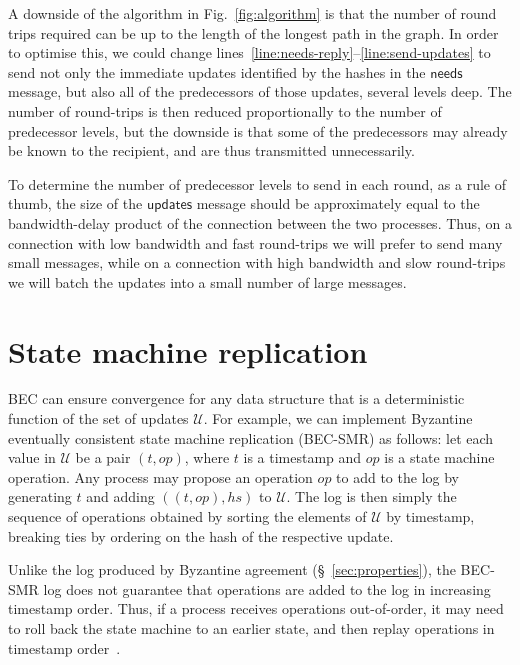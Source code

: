 \documentclass[manuscript,anonymous]{acmart}
\begin{document}
A downside of the algorithm in Fig.~\ref{fig:algorithm} is that the number of round trips required can be up to the length of the longest path in the graph.
In order to optimise this, we could change lines~\ref{line:needs-reply}--\ref{line:send-updates} to send not only the immediate updates identified by the hashes in the $\mathsf{needs}$ message, but also all of the predecessors of those updates, several levels deep.
The number of round-trips is then reduced proportionally to the number of predecessor levels, but the downside is that some of the predecessors may already be known to the recipient, and are thus transmitted unnecessarily.

To determine the number of predecessor levels to send in each round, as a rule of thumb, the size of the $\mathsf{updates}$ message should be approximately equal to the bandwidth-delay product of the connection between the two processes.
Thus, on a connection with low bandwidth and fast round-trips we will prefer to send many small messages, while on a connection with high bandwidth and slow round-trips we will batch the updates into a small number of large messages.


\section{State machine replication}\label{sec:smr}

BEC can ensure convergence for any data structure that is a deterministic function of the set of updates $\mathcal{U}$.
For example, we can implement Byzantine eventually consistent state machine replication (BEC-SMR) as follows: let each value in $\mathcal{U}$ be a pair $(t, \mathit{op})$, where $t$ is a timestamp and $\mathit{op}$ is a state machine operation.
Any process may propose an operation $op$ to add to the log by generating $t$ and adding $((t, \mathit{op}), \mathit{hs})$ to $\mathcal{U}$.
The log is then simply the sequence of operations obtained by sorting the elements of $\mathcal{U}$ by timestamp, breaking ties by ordering on the hash of the respective update.

Unlike the log produced by Byzantine agreement (\S~\ref{sec:properties}), the BEC-SMR log does not guarantee that operations are added to the log in increasing timestamp order.
Thus, if a process receives operations out-of-order, it may need to roll back the state machine to an earlier state, and then replay operations in timestamp order~\cite{Jefferson:1985em}.
\end{document}
